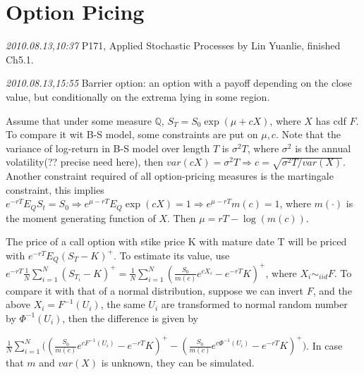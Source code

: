 \section{Option Picing}
\textit{2010.08.13,10:37} P171, Applied Stochastic Processes by Lin Yuanlie, finished Ch5.1.

\textit{2010.08.13,15:55}
Barrier option: an option with a payoff depending on the close value, but conditionally on the extrema lying in some region.

Assume that under some measure $ \mathbb{Q} $, $ S_T=S_0 \exp(\mu+cX) $, where $ X $ has cdf $ F$. To compare it wit B-S model, some constraints are put on $\mu, c $. Note that the variance of log-return in B-S model over length $ T $ is $ \sigma^2T $, where $ \sigma^2 $ is the annual volatility(?? precise need here), then $ var(cX)=\sigma^2T\Rightarrow c=\sqrt{\sigma^2T/var(X)} $. Another constraint required of all option-pricing measures is the martingale constraint, this implies $ e^{-rT}E_Q S_t=S_0 \Rightarrow e^{\mu-rT}E_Q\exp(cX)=1\Rightarrow e^{\mu-rT}m(c)=1 $, where $ m(\cdot) $ is the moment generating function of $ X $. Then $ \mu=rT-\log(m(c)) $. 

The price of a call option with stike price K with mature date T will be priced with $ e^{-rT}E_Q(S_T-K)^+ $. To estimate its value, use $ e^{-rT}\frac{1}{N}\sum_{i=1}^N(S_{T_i}-K)^+=\frac{1}{N}\sum_{i=1}^N{(\frac{S_0}{m(c)}e^{cX_i}-e^{-rT}K)^+} $, where $ X_i\sim_{iid} F $. To compare it with that of a normal distribution, suppose we can invert $ F $, and the above $ X_i=F^{-1}(U_i) $, the same $ U_i $ are transformed to normal random number by $ \Phi^{-1}(U_i) $, then the difference is given by 

$ \frac{1}{N}\sum_{i=1}^N{((\frac{S_0}{m(c)}e^{cF^{-1}(U_i)}-e^{-rT}K)^+-(\frac{S_0}{m(c)}e^{c\Phi^{-1}(U_i)}-e^{-rT}K)^+}) $. In case that $ m $ and $ var(X) $ is unknown, they can be simulated.

